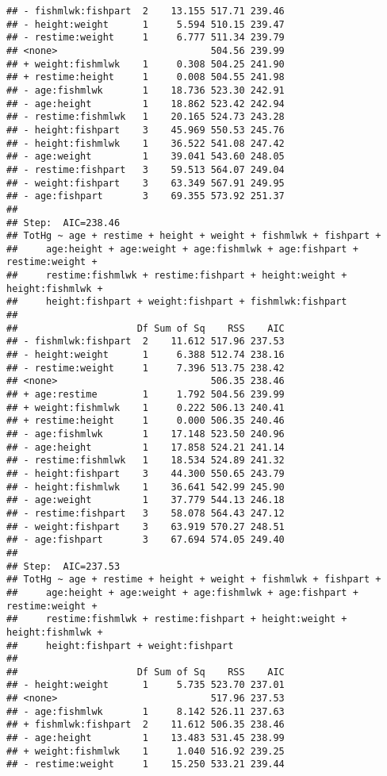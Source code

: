 \documentclass[12pt,]{article}
\begin{document}
\begin{verbatim}
## - fishmlwk:fishpart  2    13.155 517.71 239.46
## - height:weight      1     5.594 510.15 239.47
## - restime:weight     1     6.777 511.34 239.79
## <none>                           504.56 239.99
## + weight:fishmlwk    1     0.308 504.25 241.90
## + restime:height     1     0.008 504.55 241.98
## - age:fishmlwk       1    18.736 523.30 242.91
## - age:height         1    18.862 523.42 242.94
## - restime:fishmlwk   1    20.165 524.73 243.28
## - height:fishpart    3    45.969 550.53 245.76
## - height:fishmlwk    1    36.522 541.08 247.42
## - age:weight         1    39.041 543.60 248.05
## - restime:fishpart   3    59.513 564.07 249.04
## - weight:fishpart    3    63.349 567.91 249.95
## - age:fishpart       3    69.355 573.92 251.37
## 
## Step:  AIC=238.46
## TotHg ~ age + restime + height + weight + fishmlwk + fishpart + 
##     age:height + age:weight + age:fishmlwk + age:fishpart + restime:weight + 
##     restime:fishmlwk + restime:fishpart + height:weight + height:fishmlwk + 
##     height:fishpart + weight:fishpart + fishmlwk:fishpart
## 
##                     Df Sum of Sq    RSS    AIC
## - fishmlwk:fishpart  2    11.612 517.96 237.53
## - height:weight      1     6.388 512.74 238.16
## - restime:weight     1     7.396 513.75 238.42
## <none>                           506.35 238.46
## + age:restime        1     1.792 504.56 239.99
## + weight:fishmlwk    1     0.222 506.13 240.41
## + restime:height     1     0.000 506.35 240.46
## - age:fishmlwk       1    17.148 523.50 240.96
## - age:height         1    17.858 524.21 241.14
## - restime:fishmlwk   1    18.534 524.89 241.32
## - height:fishpart    3    44.300 550.65 243.79
## - height:fishmlwk    1    36.641 542.99 245.90
## - age:weight         1    37.779 544.13 246.18
## - restime:fishpart   3    58.078 564.43 247.12
## - weight:fishpart    3    63.919 570.27 248.51
## - age:fishpart       3    67.694 574.05 249.40
## 
## Step:  AIC=237.53
## TotHg ~ age + restime + height + weight + fishmlwk + fishpart + 
##     age:height + age:weight + age:fishmlwk + age:fishpart + restime:weight + 
##     restime:fishmlwk + restime:fishpart + height:weight + height:fishmlwk + 
##     height:fishpart + weight:fishpart
## 
##                     Df Sum of Sq    RSS    AIC
## - height:weight      1     5.735 523.70 237.01
## <none>                           517.96 237.53
## - age:fishmlwk       1     8.142 526.11 237.63
## + fishmlwk:fishpart  2    11.612 506.35 238.46
## - age:height         1    13.483 531.45 238.99
## + weight:fishmlwk    1     1.040 516.92 239.25
## - restime:weight     1    15.250 533.21 239.44

\end{verbatim}
\end{document}
